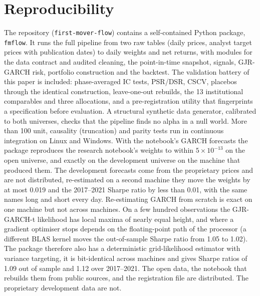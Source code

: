 \section{Reproducibility}

The repository (\texttt{first-mover-flow}) contains a self-contained Python package, \texttt{fmflow}. It runs the full pipeline from two raw tables (daily prices, analyst target prices with publication dates) to daily weights and net returns, with modules for the data contract and audited cleaning, the point-in-time snapshot, signals, GJR-GARCH risk, portfolio construction and the backtest. The validation battery of this paper is included: phase-averaged IC tests, PSR/DSR, CSCV, placebos through the identical construction, leave-one-out rebuilds, the 13 institutional comparables and three allocations, and a pre-registration utility that fingerprints a specification before evaluation. A structural synthetic data generator, calibrated to both universes, checks that the pipeline finds no alpha in a null world. More than 100 unit, causality (truncation) and parity tests run in continuous integration on Linux and Windows. With the notebook's GARCH forecasts the package reproduces the research notebook's weights to within $5\times10^{-13}$ on the open universe, and exactly on the development universe on the machine that produced them. The development forecasts come from the proprietary prices and are not distributed, re-estimated on a second machine they move the weights by at most 0.019 and the 2017--2021 Sharpe ratio by less than 0.01, with the same names long and short every day. Re-estimating GARCH from scratch is exact on one machine but not across machines. On a few hundred observations the GJR-GARCH-t likelihood has local maxima of nearly equal height, and where a gradient optimiser stops depends on the floating-point path of the processor (a different BLAS kernel moves the out-of-sample Sharpe ratio from 1.05 to 1.02). The package therefore also has a deterministic grid-likelihood estimator with variance targeting, it is bit-identical across machines and gives Sharpe ratios of 1.09 out of sample and 1.12 over 2017--2021. The open data, the notebook that rebuilds them from public sources, and the registration file are distributed. The proprietary development data are not.
